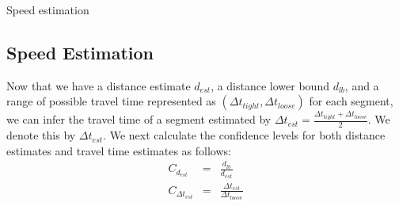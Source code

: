 \begin{algorithm}
 \caption{Speed estimation}\label{alg:speed_est}
\end{algorithm}

\subsection{Speed Estimation}

Now that we have a distance estimate $d_{est}$, a distance lower bound $d_{lb}$, and a range of possible travel time represented as $(\Delta t_{tight}, \Delta t_{loose})$ for each segment, we can infer the travel time of a segment estimated by $\Delta t_{est} = \frac{\Delta t_{tight} + \Delta t_{loose}}{2}$. We denote this by $\Delta t_{est}$. We next calculate the confidence levels for both distance estimates and travel time estimates as follows:
\begin{eqnarray}
  C_{d_{est}} &=& \frac{d_{lb}}{d_{est}} \\
  C_{\Delta t_{est}} &=& \frac{\Delta t_{est}}{\Delta t_{loose}}
\end{eqnarray}

